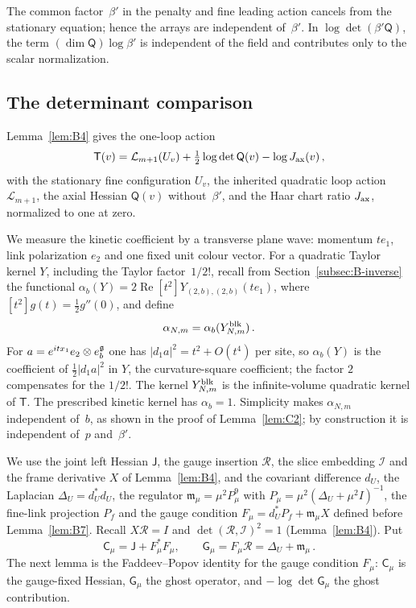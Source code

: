 The common factor~$\beta'$ in the penalty and fine leading action cancels from the stationary equation; hence the arrays are independent of~$\beta'$. In $\log\det(\beta'\mathsf Q)$, the term $(\dim\mathsf Q)\log\beta'$ is independent of the field and contributes only to the scalar normalization.

\subsection{The determinant comparison}\label{subsec:C-determinant}

Lemma~\ref{lem:B4} gives the one-loop action
\begin{equation*}
\mathsf T(v)=\mathcal L_{m+1}(U_v)+\tfrac12\log\det\mathsf Q(v)-\log J_{\rm ax}(v)\,,
\end{equation*}
with the stationary fine configuration $U_v$, the inherited quadratic loop action $\mathcal L_{m+1}$, the axial Hessian $\mathsf Q(v)$ without~$\beta'$, and the Haar chart ratio $J_{\rm ax}$, normalized to one at zero.

We measure the kinetic coefficient by a transverse plane wave: momentum $te_1$, link polarization $e_2$ and one fixed unit colour vector. For a quadratic Taylor kernel $Y$, including the Taylor factor~$1/2!$, recall from Section~\ref{subsec:B-inverse} the functional $\alpha_b(Y)=2\operatorname{Re}[t^2]Y_{(2,b),(2,b)}(te_1)$, where $[t^2]g(t)=\tfrac12g''(0)$, and define
\begin{equation*}
\alpha_{N,m}=\alpha_b(Y^{\rm blk}_{N,m})\,.
\end{equation*}
For $a=e^{itx_1}e_2\otimes e_b^{\mathfrak{g}}$ one has $|d_1a|^2=t^2+O(t^4)$ per site, so $\alpha_b(Y)$ is the coefficient of $\frac12|d_1a|^2$ in $Y$, the curvature-square coefficient; the factor $2$ compensates for the $1/2!$. The kernel $Y^{\rm blk}_{N,m}$ is the infinite-volume quadratic kernel of $\mathsf T$. The prescribed kinetic kernel has $\alpha_b=1$. Simplicity makes $\alpha_{N,m}$ independent of~$b$, as shown in the proof of Lemma~\ref{lem:C2}; by construction it is independent of~$p$ and~$\beta'$.

We use the joint left Hessian $\mathsf J$, the gauge insertion $\mathcal R$, the slice embedding $\mathcal I$ and the frame derivative $X$ of Lemma~\ref{lem:B4}, and the covariant difference $d_U$, the Laplacian $\Delta_U=d_U^*d_U$, the regulator $\mathfrak m_\mu=\mu^2P_\mu^9$ with $P_\mu=\mu^2(\Delta_U+\mu^2I)^{-1}$, the fine-link projection $P_f$ and the gauge condition $F_\mu=d_U^*P_f+\mathfrak m_\mu X$ defined before Lemma~\ref{lem:B7}. Recall $X\mathcal R=I$ and $\det(\mathcal R,\mathcal I)^2=1$ (Lemma~\ref{lem:B4}). Put
\begin{equation*}
\mathsf C_\mu=\mathsf J+F_\mu^*F_\mu,\qquad
\mathsf G_\mu=F_\mu\mathcal R=\Delta_U+\mathfrak m_\mu\,.
\end{equation*}
The next lemma is the Faddeev--Popov identity for the gauge condition $F_\mu$: $\mathsf C_\mu$ is the gauge-fixed Hessian, $\mathsf G_\mu$ the ghost operator, and $-\log\det\mathsf G_\mu$ the ghost contribution.

